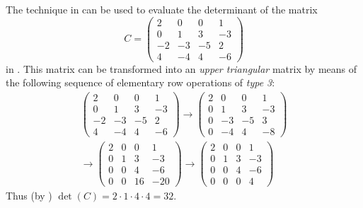 \begin{example} \label{example 4.2.6}
The technique in  can be used to evaluate the determinant of the matrix
\[
    C = \left(\begin{array}{rrrr}
        2 & 0 & 0 & 1 \\
        0 & 1 & 3 & -3 \\
        -2 & -3 & -5 & 2 \\
        4 & -4 & 4 & -6
    \end{array}\right)
\]
in .
This matrix can be transformed into an \emph{upper triangular} matrix by means of the following sequence of elementary row operations of \emph{type 3}:
\[
    \begin{aligned}
    \left(\begin{array}{rrrr}
        2 & 0 & 0 & 1 \\
        0 & 1 & 3 & -3 \\
        -2 & -3 & -5 & 2 \\
        4 & -4 & 4 & -6
    \end{array}\right)
    \longrightarrow\left(\begin{array}{rrrr}
        2 & 0 & 0 & 1 \\
        0 & 1 & 3 & -3 \\
        0 & -3 & -5 & 3 \\
        0 & -4 & 4 & -8
    \end{array}\right) \\
    \longrightarrow\left(\begin{array}{rrrrr}
        2 & 0 & 0 & 1 \\
        0 & 1 & 3 & -3 \\
        0 & 0 & 4 & -6 \\
        0 & 0 & 16 & -20
    \end{array}\right)
    \longrightarrow\left(\begin{array}{rrrrrr}
        2 & 0 & 0 & 1 \\
        0 & 1 & 3 & -3 \\
        0 & 0 & 4 & -6 \\
        0 & 0 & 0 & 4
    \end{array}\right)
    \end{aligned}
\]
Thus (by ) \(\det(C) = 2 \cdot 1 \cdot 4 \cdot 4 = 32\).
\end{example}

